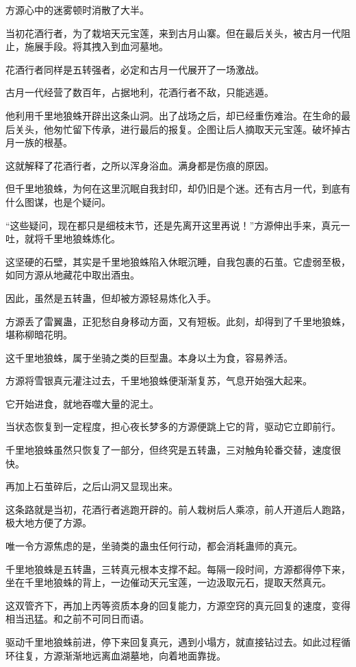 \begin{this_body}
方源心中的迷雾顿时消散了大半。

当初花酒行者，为了栽培天元宝莲，来到古月山寨。但在最后关头，被古月一代阻止，施展手段。将其拽入到血河墓地。

花酒行者同样是五转强者，必定和古月一代展开了一场激战。

古月一代经营了数百年，占据地利，花酒行者不敌，只能逃遁。

他利用千里地狼蛛开辟出这条山洞。出了战场之后，却已经重伤难治。在生命的最后关头，他匆忙留下传承，进行最后的报复。企图让后人摘取天元宝莲。破坏掉古月一族的根基。

这就解释了花酒行者，之所以浑身浴血。满身都是伤痕的原因。

但千里地狼蛛，为何在这里沉眠自我封印，却仍旧是个迷。还有古月一代，到底有什么图谋，也是个疑问。

“这些疑问，现在都只是细枝末节，还是先离开这里再说！”方源伸出手来，真元一吐，就将千里地狼蛛炼化。

这坚硬的石壁，其实是千里地狼蛛陷入休眠沉睡，自我包裹的石茧。它虚弱至极，如同方源从地藏花中取出酒虫。

因此，虽然是五转蛊，但却被方源轻易炼化入手。

方源丢了雷翼蛊，正犯愁自身移动方面，又有短板。此刻，却得到了千里地狼蛛，堪称柳暗花明。

这千里地狼蛛，属于坐骑之类的巨型蛊。本身以土为食，容易养活。

方源将雪银真元灌注过去，千里地狼蛛便渐渐复苏，气息开始强大起来。

它开始进食，就地吞噬大量的泥土。

当状态恢复到一定程度，担心夜长梦多的方源便跳上它的背，驱动它立即前行。

千里地狼蛛虽然只恢复了一部分，但终究是五转蛊，三对触角轮番交替，速度很快。

再加上石茧碎后，之后山洞又显现出来。

这条路就是当初，花酒行者逃跑开辟的。前人栽树后人乘凉，前人开道后人跑路，极大地方便了方源。

唯一令方源焦虑的是，坐骑类的蛊虫任何行动，都会消耗蛊师的真元。

千里地狼蛛是五转蛊，三转真元根本支撑不起。每隔一段时间，方源都得停下来，坐在千里地狼蛛的背上，一边催动天元宝莲，一边汲取元石，提取天然真元。

这双管齐下，再加上丙等资质本身的回复能力，方源空窍的真元回复的速度，变得相当迅猛。和之前不可同日而语。

驱动千里地狼蛛前进，停下来回复真元，遇到小塌方，就直接钻过去。如此过程循环往复，方源渐渐地远离血湖墓地，向着地面靠拢。

\end{this_body}

